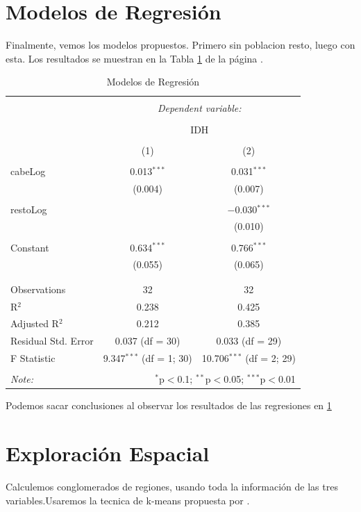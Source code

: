 \documentclass{article}
\begin{document}
\section{Modelos de Regresión}

Finalmente, vemos los modelos propuestos. Primero sin poblacion resto, luego con esta. Los resultados se muestran en la Tabla \ref{regresiones} de la página \pageref{regresiones}.



\begin{table}[!htbp] \centering 
  \caption{Modelos de Regresión} 
  \label{regresiones} 
\begin{tabular}{@{\extracolsep{5pt}}lcc} 
\\[-1.8ex]\hline 
\hline \\[-1.8ex] 
 & \multicolumn{2}{c}{\textit{Dependent variable:}} \\ 
\cline{2-3} 
\\[-1.8ex] & \multicolumn{2}{c}{IDH} \\ 
\\[-1.8ex] & (1) & (2)\\ 
\hline \\[-1.8ex] 
 cabeLog & 0.013$^{***}$ & 0.031$^{***}$ \\ 
  & (0.004) & (0.007) \\ 
  & & \\ 
 restoLog &  & $-$0.030$^{***}$ \\ 
  &  & (0.010) \\ 
  & & \\ 
 Constant & 0.634$^{***}$ & 0.766$^{***}$ \\ 
  & (0.055) & (0.065) \\ 
  & & \\ 
\hline \\[-1.8ex] 
Observations & 32 & 32 \\ 
R$^{2}$ & 0.238 & 0.425 \\ 
Adjusted R$^{2}$ & 0.212 & 0.385 \\ 
Residual Std. Error & 0.037 (df = 30) & 0.033 (df = 29) \\ 
F Statistic & 9.347$^{***}$ (df = 1; 30) & 10.706$^{***}$ (df = 2; 29) \\ 
\hline 
\hline \\[-1.8ex] 
\textit{Note:}  & \multicolumn{2}{r}{$^{*}$p$<$0.1; $^{**}$p$<$0.05; $^{***}$p$<$0.01} \\ 
\end{tabular} 
\end{table} 
Podemos sacar conclusiones al observar los resultados de las  regresiones en \ref{regresiones}

\section{Exploración Espacial}

Calculemos conglomerados de regiones, usando toda la información de las tres variables.Usaremos la tecnica de k-means propuesta por \cite{macqueen_methods_nodate}.




\end{document}

